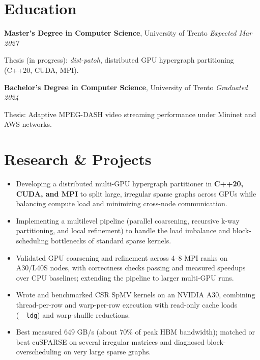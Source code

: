 \section{Education}
\noindent\textbf{Master's Degree in Computer Science}, University of Trento \hfill \textit{Expected Mar 2027}\par
{\small Thesis (in progress): \textit{dist-patoh}, distributed GPU hypergraph partitioning (C++20, CUDA, MPI).}\par
\vspace{2pt}
\noindent\textbf{Bachelor's Degree in Computer Science}, University of Trento \hfill \textit{Graduated 2024}\par
{\small Thesis: Adaptive MPEG-DASH video streaming performance under Mininet and AWS networks.}\par

\section{Research \& Projects}

\begin{itemize}[nosep, after=\strut, leftmargin=1.5em, itemsep=1pt, label=\color{accent}\textbullet]
    \item Developing a distributed multi-GPU hypergraph partitioner in \textbf{C++20, CUDA, and MPI} to split large, irregular sparse graphs across GPUs while balancing compute load and minimizing cross-node communication.
    \item Implementing a multilevel pipeline (parallel coarsening, recursive k-way partitioning, and local refinement) to handle the load imbalance and block-scheduling bottlenecks of standard sparse kernels.
    \item Validated GPU coarsening and refinement across 4--8 MPI ranks on A30/L40S nodes, with correctness checks passing and measured speedups over CPU baselines; extending the pipeline to larger multi-GPU runs.
\end{itemize}

\projectdivider

\begin{itemize}[nosep, after=\strut, leftmargin=1.5em, itemsep=1pt, label=\color{accent}\textbullet]
    \item Wrote and benchmarked CSR SpMV kernels on an NVIDIA A30, combining thread-per-row and warp-per-row execution with read-only cache loads (\texttt{\_\_ldg}) and warp-shuffle reductions.
    \item Best measured 649 GB/s (about 70\% of peak HBM bandwidth); matched or beat cuSPARSE on several irregular matrices and diagnosed block-overscheduling on very large sparse graphs.
\end{itemize}

